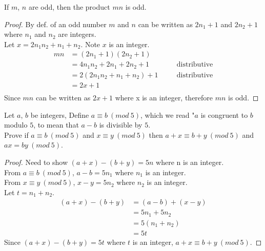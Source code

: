 \begin{tcolorbox}[title=Problem 7, breakable]
If $m$, $n$ are odd, then the product $mn$ is odd.
\end{tcolorbox}

\begin{proof}
By def. of an odd number $m$ and $n$ can be written as $2n_1 + 1$ and $2n_2 + 1$ 
where $n_1$ and $n_2$ are integers. \\
Let $x = 2n_1 n_2 + n_1 + n_2$. Note $x$ is an integer.
\begin{align*}
mn &= (2n_1 + 1)(2n_2 + 1) && \\
&= 4 n_1 n_2 + 2 n_1 + 2 n_2 + 1 && \quad \text{distributive} \\
&= 2 (2n_1 n_2 + n_1 + n_2) + 1 && \quad \text{distributive} \\
&= 2 x + 1 && \quad \text{} \\
\end{align*}
Since $mn$ can be written as $2x + 1$ where x is an integer, therefore $mn$ is odd.
\end{proof}

\begin{tcolorbox}[title=Problem 24, breakable]
Let $a$, $b$ be integers, Define $a \equiv b\ (mod\ 5)$, which we read "$a$ is congruent
to $b$ modulo $5$, to mean that $a - b$ is divisible by $5$. \\
Prove if $a \equiv b\ (mod\ 5)$ and $x \equiv y\ (mod\ 5)$ then  $a + x \equiv b + y\ (mod\ 5)$
and $ax = by\ (mod\ 5)$.
\end{tcolorbox}

\begin{proof} 
Need to show $(a + x) - (b + y) = 5n$ where n is an integer. \\
From $a \equiv b\ (mod\ 5)$, $a - b = 5n_1$ where $n_1$ is an integer. \\
From $x \equiv y\ (mod\ 5)$, $x - y = 5n_2$ where $n_2$ is an integer. \\
Let $t = n_1 + n_2$.
\begin{align*}
(a + x) - (b + y) &= (a - b) + (x - y) \\
&= 5n_1 + 5n_2 \\
&= 5(n_1 + n_2) \\
&= 5t
\end{align*}
Since $(a + x) - (b + y) = 5t$ where $t$ is an integer, $a + x \equiv b + y\ (mod\ 5)$.
\end{proof}

